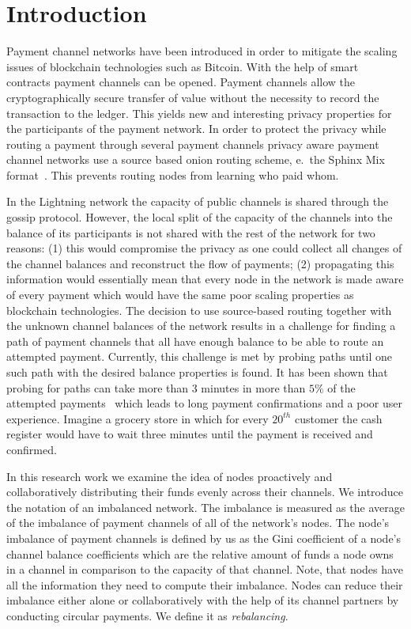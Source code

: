 \documentclass[a4paper]{paper}
\begin{document}
\section{Introduction}
Payment channel networks have been introduced in order to mitigate the scaling issues of blockchain technologies such as Bitcoin\cite{poon2016bitcoin}.
With the help of smart contracts payment channels can be opened. 
Payment channels allow the cryptographically secure transfer of value without the necessity to record the transaction to the ledger.
This yields new and interesting privacy properties for the participants of the payment network.
In order to protect the privacy while routing a payment through several payment channels privacy aware payment channel networks use a source based onion routing scheme, e.~the Sphinx Mix format~\cite{danezis2009sphinx}.
This prevents routing nodes from learning who paid whom.

In the Lightning network the capacity of public channels is shared through the gossip protocol. 
However, the local split of the capacity of the channels into the balance of its participants is not shared with the rest of the network for two reasons: 
(1) this would compromise the privacy as one could collect all changes of the channel balances and reconstruct the flow of payments;
(2) propagating this information would essentially mean that every node in the network is made aware of every payment which would have the same poor scaling properties as blockchain technologies.
The decision to use source-based routing together with the unknown channel balances of the network results in a challenge for finding a path of payment channels that all have enough balance to be able to route an attempted payment.
Currently, this challenge is met by probing paths until one such path with the desired balance properties is found.
It has been shown that probing for paths can take more than 3 minutes in more than $5\%$ of the attempted payments~\cite{decker2019lnconf} which leads to long payment confirmations and a poor user experience.
Imagine a grocery store in which for every $20^{th}$ customer the cash register would have to wait three minutes until the payment is received and confirmed.

In this research work we examine the idea of nodes proactively and collaboratively distributing their funds evenly across their channels.
We introduce the notation of an imbalanced network.
The imbalance is measured as the average of the imbalance of payment channels of all of the network's nodes.
The node's imbalance of payment channels is defined by us as the Gini coefficient of a node's channel balance coefficients which are the relative amount of funds a node owns in a channel in comparison to the capacity of that channel.
Note, that nodes have all the information they need to compute their imbalance. 
Nodes can reduce their imbalance either alone or collaboratively with the help of its channel partners by conducting circular payments. We define it as {\em rebalancing}.
\end{document}
